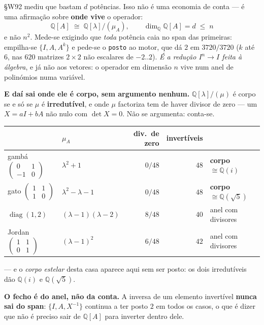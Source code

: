 \documentclass[11pt,a4paper]{article}
\newcommand{\code}[1]{\texttt{\small #1}}
\newcommand{\Q}{\ensuremath{\mathbb{Q}}}
\begin{document}
\noindent §W92 mediu que bastam $d$ potências. Isso não é uma economia de conta ---
é uma afirmação sobre \textbf{onde vive} o operador:
\[
\boxed{\;\Q[A]\;\cong\;\Q[\lambda]/(\mu_A),\qquad \dim_{\Q}\Q[A]=d\;\le\;n\;}
\]
e não $n^{2}$. Mede-se exigindo que \emph{toda} potência caia no span das
primeiras: empilha-se $\{I,A,A^{k}\}$ e pede-se o \code{posto} ao motor, que dá $2$
em $3720/3720$ ($k$ até $6$, nas $620$ matrizes $2\times2$ não escalares de
$-2..2$). \emph{É a redução $I^{n}\to I$ feita à álgebra}, e já não aos vetores: o
operador em dimensão $n$ vive num anel de polinómios numa variável.

\medskip\noindent\textbf{E daí sai onde ele é corpo, sem argumento nenhum.}
$\Q[\lambda]/(\mu)$ é corpo se e só se $\mu$ é \textbf{irredutível}, e onde $\mu$
factoriza tem de haver divisor de zero --- um $X=aI+bA$ não nulo com $\det X=0$.
Não se argumenta: conta-se.
\begin{center}
\begin{tabular}{@{}llrrl@{}}
\toprule
 & $\mu_A$ & div.\ de zero & invertíveis & \\
\midrule
gambá $\left(\begin{smallmatrix}0&1\\-1&0\end{smallmatrix}\right)$ & $\lambda^{2}+1$ & $0/48$ & $48$ & \textbf{corpo} $\cong\Q(i)$\\
gato $\left(\begin{smallmatrix}1&1\\1&0\end{smallmatrix}\right)$ & $\lambda^{2}-\lambda-1$ & $0/48$ & $48$ & \textbf{corpo} $\cong\Q(\sqrt5)$\\
$\operatorname{diag}(1,2)$ & $(\lambda-1)(\lambda-2)$ & $8/48$ & $40$ & anel com divisores\\
Jordan $\left(\begin{smallmatrix}1&1\\0&1\end{smallmatrix}\right)$ & $(\lambda-1)^{2}$ & $6/48$ & $42$ & anel com divisores\\
\bottomrule
\end{tabular}
\end{center}
--- e o \emph{corpo estelar} desta casa aparece aqui sem ser posto: os dois
irredutíveis dão $\Q(i)$ e $\Q(\sqrt5)$.

\medskip\noindent\textbf{O fecho é do anel, não da conta.} A inversa de um
elemento invertível \textbf{nunca sai do span}: $\{I,A,X^{-1}\}$ continua a ter
posto $2$ em todos os casos, o que é dizer que não é preciso sair de $\Q[A]$ para
inverter dentro dele.
\end{document}
